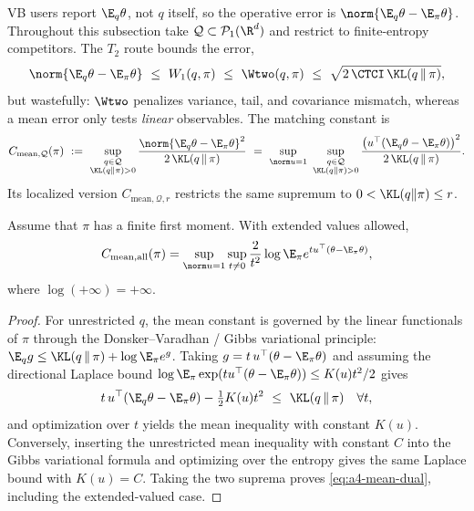 \documentclass[../../main.tex]{subfiles}
\begin{document}
VB users report $\E_q\theta$, not $q$ itself, so the operative error is
$\norm{\E_q\theta-\E_\pi\theta}$. Throughout this subsection take
$\mathcal Q\subset\mathcal P_1(\R^d)$ and restrict to finite-entropy competitors. The $T_2$ route
bounds the error,
\begin{equation}\label{eq:a4-t2-to-mean}
  \norm{\E_q\theta-\E_\pi\theta}\ \le\ W_1(q,\pi)\ \le\ \Wtwo(q,\pi)\ \le\ \sqrt{2\,\CTCI\,\KL(q\,\|\,\pi)},
\end{equation}
but wastefully: $\Wtwo$ penalizes variance, tail, and covariance mismatch, whereas a mean error
only tests \emph{linear} observables. The matching constant is
\begin{equation}\label{eq:a4-cmean}
  C_{\mathrm{mean},\mathcal Q}(\pi)\ :=\ \sup_{\substack{q\in\mathcal Q\\ \KL(q\|\pi)>0}}
  \frac{\norm{\E_q\theta-\E_\pi\theta}^2}{2\,\KL(q\,\|\,\pi)}
  \ =\ \sup_{\norm u=1}\ \sup_{\substack{q\in\mathcal Q\\ \KL(q\|\pi)>0}}
  \frac{\big(u^\top(\E_q\theta-\E_\pi\theta)\big)^2}{2\,\KL(q\,\|\,\pi)} .
\end{equation}
Its localized version $C_{\mathrm{mean},\mathcal Q,r}$ restricts the same supremum to
$0<\KL(q\|\pi)\le r$.

\begin{theorem}
\label{thm:a4-mean-dual}
Assume that $\pi$ has a finite first moment. With extended values allowed,
\begin{equation}\label{eq:a4-mean-dual}
 C_{\mathrm{mean},\mathrm{all}}(\pi)
 =\sup_{\norm u=1}\sup_{t\ne0}
 \frac{2}{t^2}\log\E_\pi e^{t u^\top(\theta-\E_\pi\theta)},
\end{equation}
where $\log(+\infty)=+\infty$.
\end{theorem}

\begin{proof}
For unrestricted $q$, the mean constant is governed by the linear functionals of $\pi$ through
the Donsker--Varadhan / Gibbs variational principle:
$\E_q g\le\KL(q\,\|\,\pi)+\log\E_\pi e^g$. Taking
$g=t\,u^\top(\theta-\E_\pi\theta)$ and assuming the directional Laplace bound
$\log\E_\pi\exp(tu^\top(\theta-\E_\pi\theta))\le K(u)t^2/2$ gives
\[
  t\,u^\top(\E_q\theta-\E_\pi\theta)-\tfrac12K(u)t^2\ \le\ \KL(q\,\|\,\pi)\quad\forall t,
\]
and optimization over $t$ yields the mean inequality with constant $K(u)$. Conversely, inserting
the unrestricted mean inequality with constant $C$ into the Gibbs variational formula and
optimizing over the entropy gives the same Laplace bound with $K(u)=C$. Taking the two suprema
proves \eqref{eq:a4-mean-dual}, including the extended-valued case.
\end{proof}
\end{document}
